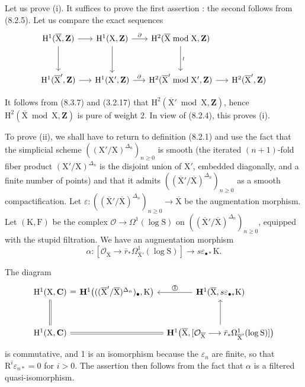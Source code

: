 \documentclass[11pt,leqno]{article}
\begin{document}
Let us prove (i). It suffices to prove the first assertion : the second follows from (8.2.5). Let us compare the exact sequences
\[
\begin{tikzcd}[column sep=1.5em,row sep=3em]
\mathrm{H}^{1}(\overline{\mathrm{X}},\mathbf{Z})
 \arrow[r] \arrow[d]
&
\mathrm{H}^{1}(\mathrm{X},\mathbf{Z})
 \arrow[r,"\partial"] \arrow[d]
&
\mathrm{H}^{2}(\overline{\mathrm{X}}\bmod\mathrm{X},\mathbf{Z})
 \arrow[d,"\wr"]
&
\\
\mathrm{H}^{1}(\overline{\mathrm{X}}',\mathbf{Z})
 \arrow[r]
&
\mathrm{H}^{1}(\mathrm{X}',\mathbf{Z})
 \arrow[r,"\partial"]
&
\mathrm{H}^{2}(\overline{\mathrm{X}}'\bmod\mathrm{X}',\mathbf{Z})
 \arrow[r]
&
\mathrm{H}^{2}(\overline{\mathrm{X}}',\mathbf{Z})
\end{tikzcd}
\]

It follows from (8.3.7) and (3.2.17) that \(\mathrm{H}^{2}(\overline{\mathrm{X}}'\bmod\mathrm{X},\mathbf{Z})\), hence \(\mathrm{H}^{2}(\overline{\mathrm{X}}\bmod\mathrm{X},\mathbf{Z})\) is pure of weight 2. In view of (8.2.4), this proves (i).

To prove (ii), we shall have to return to definition (8.2.1) and use the fact that the simplicial scheme \(((\mathrm{X}'/\mathrm{X})^{\Delta_n})_{n\geq0}\) is smooth (the iterated \((n+1)\)-fold fiber product \((\mathrm{X}'/\mathrm{X})^{\Delta_n}\) is the disjoint union of \(\mathrm{X}'\), embedded diagonally, and a finite number of points) and that it admits \(((\overline{\mathrm{X}}'/\overline{\mathrm{X}})^{\Delta_n})_{n\geq0}\) as a smooth compactification. Let \(\varepsilon:((\overline{\mathrm{X}}'/\overline{\mathrm{X}})^{\Delta_n})_{n\geq0}\to\overline{\mathrm{X}}\) be the augmentation morphism. Let \((\mathrm{K},\mathrm{F})\) be the complex \(\mathcal{O}\to\Omega^{1}(\log\mathrm{S})\) on \(((\overline{\mathrm{X}}'/\overline{\mathrm{X}})^{\Delta_n})_{n\geq0}\), equipped with the stupid filtration. We have an augmentation morphism
\[
\alpha:
[\mathcal{O}_{\overline{\mathrm{X}}}\to
 \bar r_*\Omega^{1}_{\overline{\mathrm{X}}'}(\log\mathrm{S})]
\longrightarrow s\varepsilon_{\bullet *}\mathrm{K}.
\]

The diagram
\[
\begin{tikzcd}[column sep=0.7em,row sep=3em]
\mathrm{H}^{1}(\mathrm{X},\mathbf{C})
 \arrow[r,phantom,"{\textstyle=}" description]
 \arrow[d,equal]
&
\mathbf{H}^{1}\bigl(
 ((\overline{\mathrm{X}}'/\overline{\mathrm{X}})^{\Delta_n})_{\bullet},
 \mathrm{K}\bigr)
&
\mathbf{H}^{1}(\overline{\mathrm{X}},s\varepsilon_{\bullet *}\mathrm{K})
 \arrow[l,"\text{\textcircled{1}}"']
\\
\mathrm{H}^{1}(\mathrm{X},\mathbf{C}) \arrow[rr,equal]
&&
\mathbf{H}^{1}\bigl(\overline{\mathrm{X}},
 [\mathcal{O}_{\overline{\mathrm{X}}}\longrightarrow
 \bar r_*\Omega^{1}_{\overline{\mathrm{X}}'}(\log\mathrm{S})]\bigr)
 \arrow[u]
\end{tikzcd}
\]
is commutative, and 1 is an isomorphism because the \(\varepsilon_n\) are finite, so that \(\mathrm{R}^{i}\varepsilon_{n*}=0\) for \(i>0\). The assertion then follows from the fact that \(\alpha\) is a filtered quasi-isomorphism.
\end{document}
